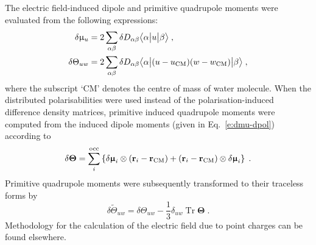 \documentclass[aip,amsmath,amssymb,reprint,floatfix]{revtex4-1}
\newcommand{\tbraket}[3]{\ensuremath{\bigl\langle {#1} \bigl\lvert {#2} \bigl\lvert {#3} \bigr\rangle}}
\newcommand{\BM}[1]{\bm{#1}}
\DeclareMathOperator{\Tr}{Tr}
\begin{document}
The electric field\hyp{}induced dipole and primitive quadrupole moments were evaluated from the following expressions:
%
\begin{subequations}\label{e:dmult}
  \begin{align}
   \delta \upmu_{u}   &= 2\sum_{\alpha\beta} \delta D_{\alpha\beta} \tbraket{\alpha}{u}{\beta}  \;,\\
   \delta \Theta_{uw} &= 2\sum_{\alpha\beta} \delta D_{\alpha\beta} \tbraket{\alpha}{(u-u_{\rm CM})(w-w_{\rm CM})}{\beta} \;, 
  \end{align}
\end{subequations}
%
where the subscript `CM' denotes the centre of mass of water molecule.
When the distributed polarisabilities were used instead of the polarisation\hyp{}induced 
difference density matrices, primitive induced quadrupole moments were computed from
the induced dipole moments (given in Eq.~\eqref{e:dmu-dpol}) according to
%
\begin{equation}\label{e:dTheta-dpol}
  \delta {\BM \Theta} = \sum_i^{\rm occ} 
   \left\{ 
       \delta {\BM \upmu}_i \otimes \left( {\bf r}_i - {\bf r}_{\rm CM} \right) 
      + \left( {\bf r}_i - {\bf r}_{\rm CM} \right) \otimes \delta {\BM \upmu}_i
   \right\} \;.
\end{equation}
%
Primitive quadrupole moments were subsequently transformed to their traceless forms by
%
\begin{equation}
  \delta \widetilde{\Theta}_{uw} = \delta \Theta_{uw} - \frac{1}{3} \delta_{uw} \Tr{\BM\Theta} \;.
\end{equation}
%
Methodology for the calculation of the electric field due to point charges
can be found elsewhere.\cite{Blasiak.Cho.JCP.2014}
\end{document}
